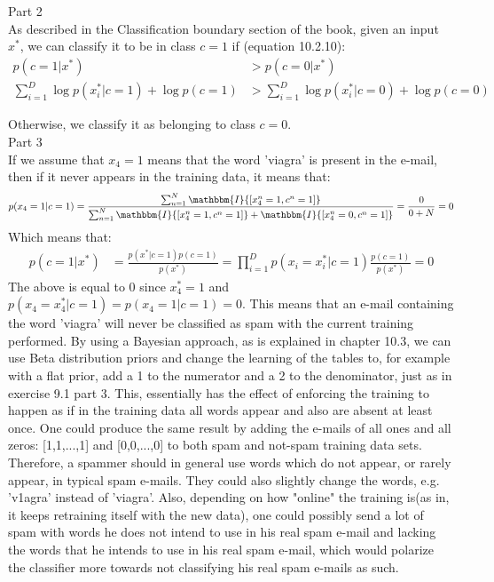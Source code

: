 \documentclass[11pt,a4paper,oneside]{report}
\begin{document}
Part 2\\
As described in the Classification boundary section of the book, given an input $x^\ast$, we can classify it to be in class $c=1$ if (equation 10.2.10):
\begin{align*}
p(c=1|x^\ast)&>p(c=0|x^\ast)\\
\sum_{i=1}^D\log p(x_i^\ast|c=1)+\log p(c=1)&>\sum_{i=1}^D\log p(x_i^\ast|c=0)+\log p(c=0)
\end{align*}

Otherwise, we classify it as belonging to class $c=0$.\\

Part 3\\
If we assume that $x_4=1$ means that the word 'viagra' is present in the e-mail, then if it never appears in the training data, it means that:
$$p(x_4=1|c=1) =  \frac{\sum_{n=1}^N \mathbbm{I}{[x_4^n=1,c^n=1]}}{\sum_{n=1}^N \mathbbm{I}{[x_4^n=1,c^n=1]}+\mathbbm{I}{[x_4^n=0,c^n=1]}}=\frac{0}{0+N}=0$$
Which means that:
\begin{align*}
p(c=1|x^\ast)&=\frac{p(x^\ast|c=1)p(c=1)}{p(x^\ast)}=\prod_{i=1}^Dp(x_i=x_i^\ast|c=1)\frac{p(c=1)}{p(x^\ast)}=0
\end{align*}
The above is equal to 0 since $x_4^\ast=1$ and $p(x_4=x_4^\ast|c=1)=p(x_4=1|c=1)=0$. This means that an e-mail containing the word 'viagra' will never be classified as spam with the current training performed. By using a Bayesian approach, as is explained in chapter 10.3, we can use Beta distribution priors and change the learning of the tables to, for example with a flat prior, add a 1 to the numerator and a 2 to the denominator, just as in exercise 9.1 part 3. This, essentially has the effect of enforcing the training to happen as if in the training data all words appear and also are absent at least once. One could produce the same result by adding the e-mails of all ones and all zeros: [1,1,...,1] and [0,0,...,0] to both spam and not-spam training data sets.\\
Therefore, a spammer should in general use words which do not appear, or rarely appear, in typical spam e-mails. They could also slightly change the words, e.g. 'v1agra' instead of 'viagra'. Also, depending on how "online" the training is(as in, it keeps retraining itself with the new data), one could possibly send a lot of spam with words he does not intend to use in his real spam e-mail and lacking the words that he intends to use in his real spam e-mail, which would polarize the classifier more towards not classifying his real spam e-mails as such.
\end{document}
